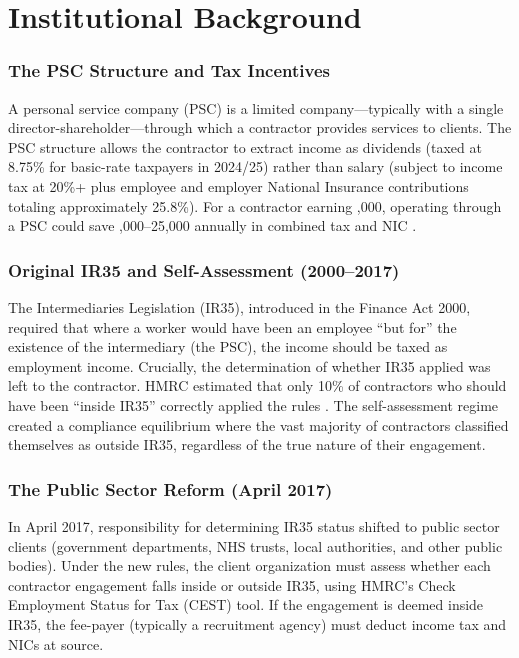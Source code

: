 \documentclass[12pt]{article}
\begin{document}
\section{Institutional Background}

\subsubsection*{The PSC Structure and Tax Incentives} A personal service company (PSC) is a limited company---typically with a single director-shareholder---through which a contractor provides services to clients. The PSC structure allows the contractor to extract income as dividends (taxed at 8.75\% for basic-rate taxpayers in 2024/25) rather than salary (subject to income tax at 20\%+ plus employee and employer National Insurance contributions totaling approximately 25.8\%). For a contractor earning ,000, operating through a PSC could save ,000--25,000 annually in combined tax and NIC \citep{hmrc2023}.

\subsubsection*{Original IR35 and Self-Assessment (2000--2017)} The Intermediaries Legislation (IR35), introduced in the Finance Act 2000, required that where a worker would have been an employee ``but for'' the existence of the intermediary (the PSC), the income should be taxed as employment income. Crucially, the determination of whether IR35 applied was left to the contractor. HMRC estimated that only 10\% of contractors who should have been ``inside IR35'' correctly applied the rules \citep{hmrc2024}. The self-assessment regime created a compliance equilibrium where the vast majority of contractors classified themselves as outside IR35, regardless of the true nature of their engagement.

\subsubsection*{The Public Sector Reform (April 2017)} In April 2017, responsibility for determining IR35 status shifted to public sector clients (government departments, NHS trusts, local authorities, and other public bodies). Under the new rules, the client organization must assess whether each contractor engagement falls inside or outside IR35, using HMRC's Check Employment Status for Tax (CEST) tool. If the engagement is deemed inside IR35, the fee-payer (typically a recruitment agency) must deduct income tax and NICs at source.
\end{document}
